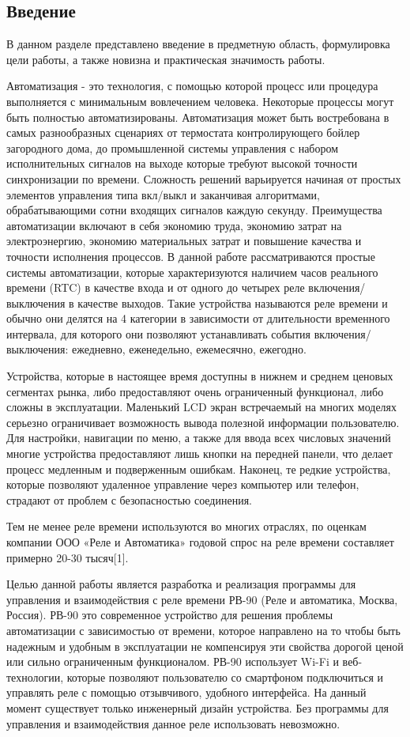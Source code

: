 \subsection{Введение}

В данном разделе представлено введение в предметную область, формулировка цели работы, а также новизна и практическая значимость работы.

Автоматизация - это технология, с помощью которой процесс или процедура выполняется с минимальным вовлечением человека. Некоторые процессы могут быть полностью автоматизированы. Автоматизация может быть востребована в самых разнообразных сценариях от термостата контролирующего бойлер загородного дома, до промышленной системы управления с набором исполнительных сигналов на выходе которые требуют высокой точности синхронизации по времени. Сложность решений варьируется начиная от простых элементов управления типа вкл/выкл и заканчивая алгоритмами, обрабатывающими сотни входящих сигналов каждую секунду. Преимущества автоматизации включают в себя экономию труда, экономию затрат на электроэнергию, экономию материальных затрат и повышение качества и точности исполнения процессов. В данной работе  рассматриваются простые системы автоматизации, которые характеризуются наличием часов реального времени (RTC) в качестве входа и от одного до четырех реле включения/выключения в качестве выходов. Такие устройства называются реле времени и обычно они делятся на 4 категории в зависимости от длительности временного интервала, для которого они позволяют устанавливать события включения/выключения: ежедневно, еженедельно, ежемесячно, ежегодно.

Устройства, которые в настоящее время доступны в нижнем и среднем ценовых  сегментах рынка, либо предоставляют очень ограниченный функционал, либо сложны в эксплуатации. Маленький LCD экран встречаемый на многих моделях серьезно ограничивает возможность вывода полезной информации пользователю. Для настройки, навигации по меню, а также для ввода всех числовых значений многие устройства предоставляют лишь кнопки на передней панели, что делает процесс медленным и подверженным ошибкам. Наконец, те редкие устройства, которые позволяют удаленное управление через компьютер или телефон, страдают от проблем с безопасностью соединения.

Тем не менее реле времени используются во многих отраслях, по оценкам компании ООО «Реле и Автоматика» годовой спрос на реле времени составляет примерно 20-30 тысяч[1].

Целью данной работы является разработка и реализация программы для управления и взаимодействия с реле времени РВ-90 (Реле и автоматика, Москва, Россия). РВ-90 это современное устройство для решения проблемы автоматизации с зависимостью от времени, которое направлено на то чтобы быть надежным и удобным в эксплуатации не компенсируя эти свойства дорогой ценой или сильно ограниченным функционалом. РВ-90 использует Wi-Fi и веб-технологии, которые позволяют пользователю со смартфоном подключиться и управлять реле с помощью отзывчивого, удобного интерфейса. На данный момент существует только инженерный дизайн устройства. Без программы для управления и взаимодействия данное реле использовать невозможно.

